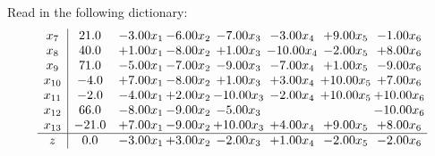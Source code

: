 \documentclass[9pt]{article}
\begin{document}
Read in the following dictionary:
\[\begin{array}{c| c c@{\hskip 2pt} c@{\hskip 2pt} c@{\hskip 2pt} c@{\hskip 2pt} c@{\hskip 2pt} c@{\hskip 2pt} }
 x_{7}   &  21.0 & -3.00 x_{1} & -6.00 x_{2} & -7.00 x_{3} & -3.00 x_{4} & +  9.00 x_{5} & -1.00 x_{6}\\
 x_{8}   &  40.0 & +  1.00 x_{1} & -8.00 x_{2} & +  1.00 x_{3} & -10.00 x_{4} & -2.00 x_{5} & +  8.00 x_{6}\\
 x_{9}   &  71.0 & -5.00 x_{1} & -7.00 x_{2} & -9.00 x_{3} & -7.00 x_{4} & +  1.00 x_{5} & -9.00 x_{6}\\
 x_{10}   &  -4.0 & +  7.00 x_{1} & -8.00 x_{2} & +  1.00 x_{3} & +  3.00 x_{4} & + 10.00 x_{5} & +  7.00 x_{6}\\
 x_{11}   &  -2.0 & -4.00 x_{1} & +  2.00 x_{2} & -10.00 x_{3} & -2.00 x_{4} & + 10.00 x_{5} & + 10.00 x_{6}\\
 x_{12}   &  66.0 & -8.00 x_{1} & -9.00 x_{2} & -5.00 x_{3} &    &   & -10.00 x_{6}\\
 x_{13}   &  -21.0 & +  7.00 x_{1} & -9.00 x_{2} & + 10.00 x_{3} & +  4.00 x_{4} & +  9.00 x_{5} & +  8.00 x_{6}\\
\hline
z    &  0.0 & -3.00 x_{1} & +  3.00 x_{2} & -2.00 x_{3} & +  1.00 x_{4} & -2.00 x_{5} & -2.00 x_{6}\\
\end{array}\]
\end{document}
